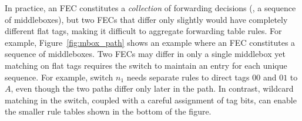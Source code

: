 In practice, an FEC constitutes a \emph{collection} of forwarding
decisions (\eg, a sequence of middleboxes), but two FECs that differ
only slightly would have completely different flat tags, making it
difficult to aggregate forwarding table rules.  For example,
Figure~\ref{fig:mbox_path} shows an example where an FEC constitutes a
sequence of middleboxes.  Two FECs may differ in only a single
middlebox yet matching on flat tags requires the switch to maintain an
entry for each unique sequence.  For example, switch $n_1$ needs
separate rules to direct tags $00$ and $01$ to $A$, even though the
two paths differ only later in the path.  In contrast, wildcard
matching in the switch, coupled with a careful assignment of tag bits,
can enable the smaller rule tables shown in the bottom of the figure.





